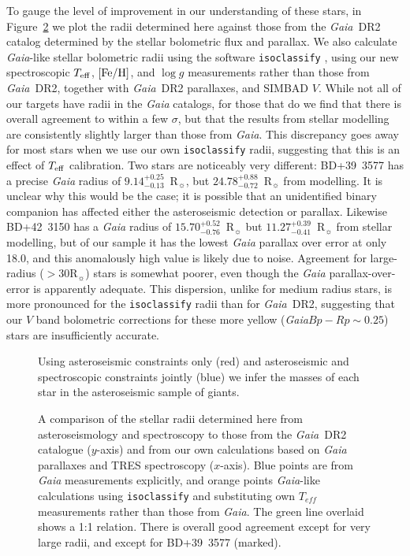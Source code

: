 \documentclass[modern]{aastex62}
\newcommand{\teff}{\mbox{$T_{\rm eff}$}\xspace}
\newcommand{\logg}{\mbox{$\log g$}\xspace}
\newcommand{\feh}{\mbox{$\rm{[Fe/H]}$}\xspace}
\newcommand{\rsun}{\mbox{$\mathrm{R}_{\sun}$}\xspace}
\newcommand{\gaia}{\textit{Gaia}\xspace}
\begin{document}
To gauge the level of improvement in our understanding of these stars, in Figure~\ref{gaia_comparison} we plot the radii determined here against those from the \gaia~DR2 catalog determined by the stellar bolometric flux and parallax. 
We also calculate \gaia-like stellar bolometric radii using the software \texttt{isoclassify} \citep{huber2017}, using our new spectroscopic \teff, \feh, and \logg measurements rather than those from \gaia~DR2, together with \gaia~DR2 parallaxes, and SIMBAD $V$. While not all of our targets have radii in the \gaia catalogs, for those that do we find that there is overall agreement to within a few $\sigma$, but that the results from stellar modelling are consistently slightly larger than those from \gaia. 
This discrepancy goes away for most stars when we use our own \texttt{isoclassify} radii, suggesting that this is an effect of \teff calibration. Two stars are noticeably very different: BD+39~3577 has a precise \gaia radius of $9.14^{+0.25}_{-0.13}$~\rsun, but $24.78^{+0.88}_{-0.72}$~\rsun from modelling. It is unclear why this would be the case; it is possible that an unidentified binary companion has affected either the asteroseismic detection or parallax. Likewise BD+42~3150 has a \gaia radius of $15.70^{+0.52}_{-0.76}$~\rsun but $11.27^{+0.39}_{-0.41}$~\rsun from stellar modelling, but of our sample it has the lowest \gaia parallax over error at only 18.0, and this anomalously high value is likely due to noise. Agreement for large-radius ($>30 \rsun$) stars is somewhat poorer, even though the \gaia parallax-over-error is apparently adequate. This dispersion, unlike for medium radius stars, is more pronounced for the \texttt{isoclassify} radii than for \gaia~DR2, suggesting that our $V$ band bolometric corrections for these more yellow (\gaia $Bp-Rp \sim 0.25$) stars are insufficiently accurate. 

\begin{figure}

\caption{\label{masses}
Using asteroseismic constraints only (red) and asteroseismic and spectroscopic constraints jointly (blue) we infer the masses of each star in the asteroseismic sample of giants.}
\end{figure}



\begin{figure}

\caption{\label{gaia_comparison}
A comparison of the stellar radii determined here from asteroseismology and spectroscopy to those from the \gaia~DR2 catalogue ($y$-axis) and from our own calculations based on \gaia parallaxes and TRES spectroscopy ($x$-axis). Blue points are from \gaia measurements explicitly, and orange points \gaia-like calculations using \texttt{isoclassify} \citep{huber2017} and substituting own $T_{eff}$ measurements rather than those from \gaia. The green line overlaid shows a 1:1 relation. There is overall good agreement except for very large radii, and except for BD+39~3577 (marked).}
\end{figure}
\end{document}
